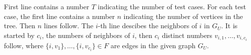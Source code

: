 First line contains a number $T$ indicating the number of test cases. 
For each test case, the first line contains a number $n$ indicating 
the number of vertices in the tree. 
Then $n$ lines follow. 
The $i$-th line descibes the neighbors of $i$ in $G_U$. 
It is started by $c_i$, the numbers of neighbors of $i$, 
then $c_i$ distinct numbers $v_{i,1},\ldots,v_{i,c_i}$ follow, where
$\{i,v_1\},\ldots,\{i,v_{c_i}\}\in F$ are edges in the given graph $G_U$.
